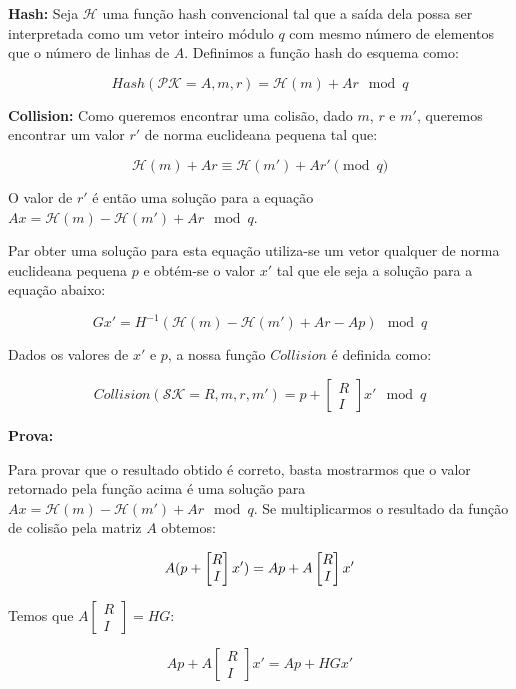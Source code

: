 \documentclass[a4paper]{article}
\begin{document}
\textbf{Hash: } Seja $\mathcal{H}$ uma função hash convencional tal
que a saída dela possa ser interpretada como um vetor inteiro módulo
$q$ com mesmo número de elementos que o número de linhas de
$A$. Definimos a função hash do esquema como:

$$
Hash(\mathcal{PK}=A, m, r) = \mathcal{H}(m) + Ar \mod q
$$

\textbf{Collision: } Como queremos encontrar uma colisão, dado $m$,
$r$ e $m'$, queremos encontrar um valor $r'$ de norma euclideana
pequena tal que:

$$
\mathcal{H}(m) + Ar  \equiv \mathcal{H}(m') + Ar' \pmod q
$$

O valor de $r'$ é então uma solução para a equação $Ax =
\mathcal{H}(m) - \mathcal{H}(m') + Ar \mod q$.

Par obter uma solução para esta equação utiliza-se um vetor qualquer
de norma euclideana pequena $p$ e obtém-se o valor $x'$ tal que ele
seja a solução para a equação abaixo:

$$
Gx' = H^{-1}(\mathcal{H}(m) - \mathcal{H}(m') + Ar - Ap) \mod q
$$

Dados os valores de $x'$ e $p$, a nossa função $Collision$ é definida
como:

$$ Collision(\mathcal{SK}=R, m, r, m') = p +
\left[\begin{matrix}R\\I\end{matrix}\right]x' \mod q
$$

\textbf{Prova:}

Para provar que o resultado obtido é correto, basta mostrarmos que o
valor retornado pela função acima é uma solução para $Ax =
\mathcal{H}(m) - \mathcal{H}(m') + Ar \mod q$. Se multiplicarmos o
resultado da função de colisão pela matriz $A$ obtemos:

$$ A(p+\left[\begin{matrix}R\\I\end{matrix}\right]x') = Ap +
A\left[\begin{matrix}R\\I\end{matrix}\right]x'\\
$$

Temos que $A\left[\begin{matrix}R\\I\end{matrix}\right] = HG$:

$$
Ap + A\left[\begin{matrix}R\\I\end{matrix}\right]x' = Ap + HGx'
$$
\end{document}
